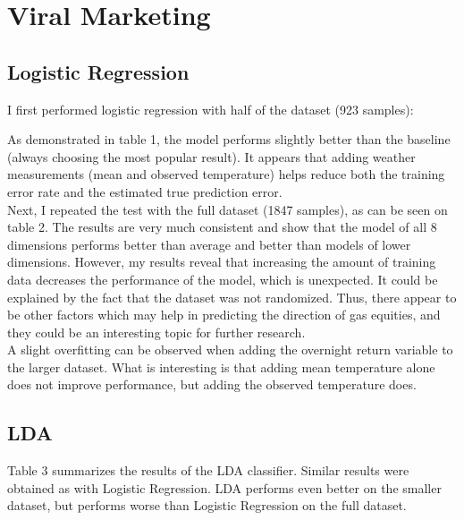 \documentclass[conference,letterpaper]{IEEEtran}
\begin{document}
\section{Viral Marketing}


\subsection{Logistic Regression}
I first performed logistic regression with half of the dataset (923 samples):



As demonstrated in table 1, the model performs slightly better than the baseline (always choosing the most popular result). It appears that adding weather measurements (mean and
observed temperature) helps reduce both the training error rate and the estimated true prediction error.\\
\indent Next, I repeated the test with the full dataset (1847 samples), as can be seen on table 2. The results are very much consistent and show that the model of all 8
dimensions performs better than average and better than models of lower dimensions. However, my results reveal that increasing the amount of training data decreases the
performance of the model, which is unexpected. It could be explained by the fact that the dataset was not randomized. Thus, there appear to be other factors which may
help in predicting the direction of gas equities, and they could be an interesting topic for further research. \\
\indent A slight overfitting can be observed when adding the overnight return variable to the larger dataset. What is interesting
is that adding mean temperature alone does not improve performance, but adding the observed temperature does. \\

\subsection{LDA}

Table 3 summarizes the results of the LDA classifier. Similar results were obtained as with Logistic Regression. LDA performs even better on the smaller dataset,
but performs worse than Logistic Regression on the full dataset. \\
\end{document}
